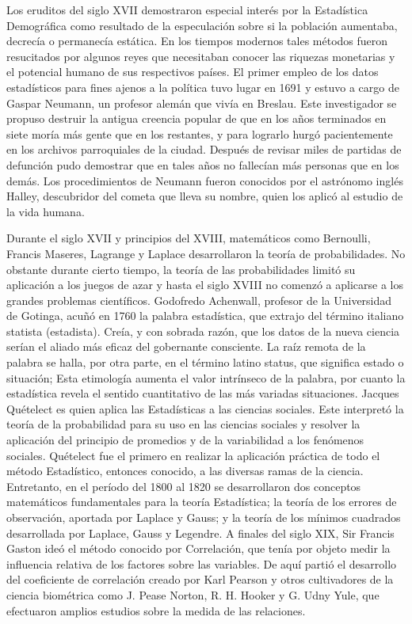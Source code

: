 \documentclass[a4paper]{report} %
\begin{document}
Los eruditos del siglo XVII demostraron especial inter\'es por la Estad\'istica Demogr\'afica como resultado de la especulaci\'on sobre si la poblaci\'on aumentaba, decrec\'ia o permanec\'ia est\'atica. En los tiempos modernos tales m\'etodos fueron resucitados por algunos reyes que necesitaban conocer las riquezas monetarias y el potencial humano de sus respectivos pa\'ises. El primer empleo de los datos estad\'isticos para fines ajenos a la pol\'itica tuvo lugar en 1691 y estuvo a cargo de Gaspar Neumann, un profesor alem\'an que viv\'ia en Breslau. Este investigador se propuso destruir la antigua creencia popular de que en los a\~nos terminados en siete mor\'ia m\'as gente que en los restantes, y para lograrlo hurg\'o pacientemente en los archivos parroquiales de la ciudad. Despu\'es de revisar miles de partidas de defunci\'on pudo demostrar que en tales a\~nos no fallec\'ian m\'as personas que en los dem\'as. Los procedimientos de Neumann fueron conocidos por el astr\'onomo ingl\'es Halley, descubridor del cometa que lleva su nombre, quien los aplic\'o al estudio de la vida humana. 

Durante el siglo XVII y principios del XVIII, matem\'aticos como Bernoulli, Francis Maseres, Lagrange y Laplace desarrollaron la teor\'ia de probabilidades. No obstante durante cierto tiempo, la teor\'ia de las probabilidades limit\'o su aplicaci\'on a los juegos de azar y hasta el siglo XVIII no comenz\'o a aplicarse a los grandes problemas cient\'ificos. Godofredo Achenwall, profesor de la Universidad de Gotinga, acu\~n\'o en 1760 la palabra estad\'istica, que extrajo del t\'ermino italiano statista (estadista). Cre\'ia, y con sobrada raz\'on, que los datos de la nueva ciencia ser\'ian el aliado m\'as eficaz del gobernante consciente. La ra\'iz remota de la palabra se halla, por otra parte, en el t\'ermino latino status, que significa estado o situaci\'on; Esta etimolog\'ia aumenta el valor intr\'inseco de la palabra, por cuanto la estad\'istica revela el sentido cuantitativo de las m\'as variadas situaciones. Jacques Qu\'etelect es quien aplica las Estad\'isticas a las ciencias sociales. Este interpret\'o la teor\'ia de la probabilidad para su uso en las ciencias sociales y resolver la aplicaci\'on del principio de promedios y de la variabilidad a los fen\'omenos sociales. Qu\'etelect fue el primero en realizar la aplicaci\'on pr\'actica de todo el m\'etodo Estad\'istico, entonces conocido, a las diversas ramas de la ciencia. Entretanto, en el per\'iodo del 1800 al 1820 se desarrollaron dos conceptos matem\'aticos fundamentales para la teor\'ia Estad\'istica; la teor\'ia de los errores de observaci\'on, aportada por Laplace y Gauss; y la teor\'ia de los m\'inimos cuadrados desarrollada por Laplace, Gauss y Legendre. A finales del siglo XIX, Sir Francis Gaston ide\'o el m\'etodo conocido por Correlaci\'on, que ten\'ia por objeto medir la influencia relativa de los factores sobre las variables. De aqu\'i parti\'o el desarrollo del coeficiente de correlaci\'on creado por Karl Pearson y otros cultivadores de la ciencia biom\'etrica como J. Pease Norton, R. H. Hooker y G. Udny Yule, que efectuaron amplios estudios sobre la medida de las relaciones.
\end{document}

